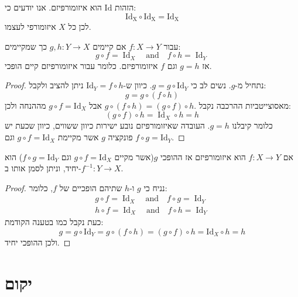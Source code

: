 \documentclass{tstextbook}
\begin{document}
\begin{example}
הזהות \(\mathrm{Id}\) הוא איזומורפיזם. אנו יודעים כי:
$$\mathrm{Id_{X}\circ Id_{X}=Id_{X}}$$
לכן כל \(X\) איזומורפי לעצמו.

\end{example}
\begin{proposition}
עבור \(f:X\to Y\) אם קיימים \(g,h:Y\to X\) כך שמקיימים:
$$g\circ f=\operatorname{Id}_{X}\quad{\mathrm{and}}\quad f\circ h=\operatorname{Id}_{Y}$$
אז \(g=h\) וגם \(f\) איזומורפיזם. כלומר עבור איזומורפיזם קיים הופכי.

\end{proposition}
\begin{proof}
נתחיל מ-\(g\). נשים לב כי \(g=g\circ\mathrm{Id}_{Y}\). כיוון ש-\(\mathrm{Id}_{Y}=f\circ h\) ניתן להציב ולקבל:
$$g=g\circ(f\circ h)$$
מאסוצייטביות ההרכבה נקבל \(g\circ(f\circ h)=(g\circ f)\circ h.\) אבל \(g \circ f = \mathrm{Id}_{X}\) מההנחה ולכן:
$$(g\circ f)\circ h=\operatorname{Id}_{X}\circ h=h$$
כלומר קיבלנו \(g=h\). העובדה שאיזומורפיזם נובע ישירות כיוון ששווים, כיוון שכעת יש פונקציה \(g\) אשר מקיימת \(g\circ f = \mathrm{Id}_{X}\) וגם \(f\circ g = \mathrm{Id}_{Y}\).

\end{proof}
\begin{proposition}
אם \(f:X\to Y\) הוא איזומורפיזם אז ההופכי \(g\)(אשר מקיים \(g\circ f = \mathrm{Id}_{X}\) וגם \(f\circ g=\mathrm{Id}_{Y}\)) הוא יחיד, וניתן לסמן אותו ב-\(f^{-1}:Y\to X\).

\end{proposition}
\begin{proof}
נניח כי \(g\) ו-\(h\) שתיהם הופכיים של \(f\), כלומר:
\begin{gather*}g\circ f=\operatorname{Id}_{X}\quad{\mathrm{and}}\quad f\circ g=\operatorname{Id}_{Y} \\h\circ f=\operatorname{Id}_{X}\quad{\mathrm{and}}\quad f\circ h=\operatorname{Id}_{Y}
\end{gather*}
כעת נקבל כמו בטענה הקודמת:
$$g=g\circ{\mathrm{Id}}_{Y}=g\circ(f\circ h)=(g\circ f)\circ h={\mathrm{Id}}_{X}\circ h=h$$
ולכן ההופכי יחיד.

\end{proof}
\section{יקום}
\end{document}
